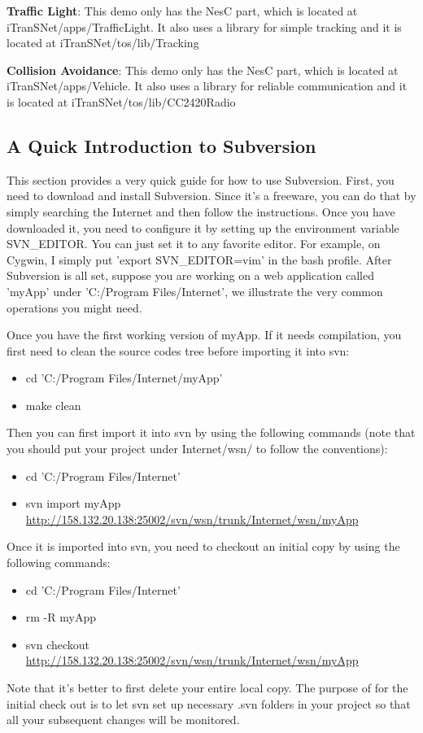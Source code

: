 \textbf{Traffic Light}: This demo only has the NesC part, which is located at iTranSNet/apps/TrafficLight. It also uses a library for simple tracking and it is located at iTranSNet/tos/lib/Tracking

\textbf{Collision Avoidance}: This demo only has the NesC part, which is located at iTranSNet/apps/Vehicle. It also uses a library for reliable communication and it is located at iTranSNet/tos/lib/CC2420Radio

\subsection{A Quick Introduction to Subversion}
\label{sec:svn}
This section provides a very quick guide for how to use Subversion. First, you need to download and install Subversion. Since it's a freeware, you can do that by simply searching the Internet and then follow the instructions. Once you have downloaded it,  you need to configure it by setting up the environment variable SVN\_EDITOR. You can just set it to any favorite editor. For example, on Cygwin, I simply put 'export SVN\_EDITOR=vim' in the bash profile. After Subversion is all set, suppose you are working on a web application called 'myApp' under 'C:/Program Files/Internet', we illustrate the very common operations you might need.

Once you have the first working version of myApp. If it needs compilation, you first need to clean the source codes tree before importing it into svn:
\begin{itemize}
\item cd 'C:/Program Files/Internet/myApp'
\item make clean
\end{itemize}

Then you can first import it into svn by using the following commands (note that you should put your project under Internet/wsn/ to follow the conventions):
\begin{itemize}
\item cd 'C:/Program Files/Internet'
\item svn import myApp \url{http://158.132.20.138:25002/svn/wsn/trunk/Internet/wsn/myApp}
\end{itemize}

Once it is imported into svn, you need to checkout an initial copy by using the following commands:
\begin{itemize}
\item cd 'C:/Program Files/Internet'
\item rm -R myApp
\item svn checkout \url{http://158.132.20.138:25002/svn/wsn/trunk/Internet/wsn/myApp}
\end{itemize}
Note that it's better to first delete your entire local copy. The purpose of for the initial check out is to let svn set up necessary .svn folders in your project so that all your subsequent changes will be monitored.

